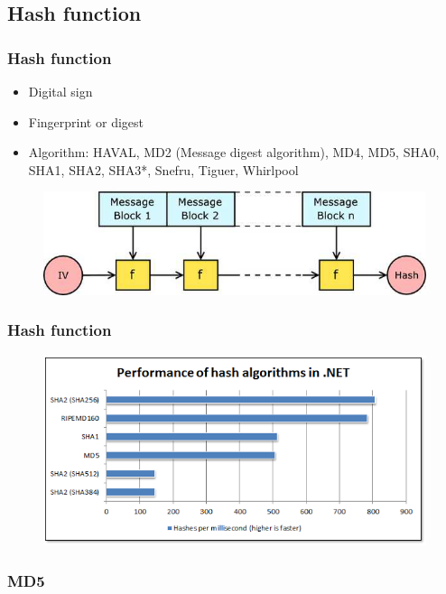 \documentclass{beamer}
\begin{document}
\subsection{Hash function}
\begin{frame}
\frametitle{Hash function}
\begin{itemize}
\item Digital sign
\item Fingerprint or digest
\item Algorithm: HAVAL, MD2 (Message digest algorithm), MD4, MD5, SHA0, SHA1, SHA2, SHA3*, Snefru, Tiguer, Whirlpool 
\end{itemize}
\begin{figure}
\includegraphics[width=0.6\linewidth]{hash.png}
\end{figure}
\end{frame}

\begin{frame}
\frametitle{Hash function}
\begin{figure}
\includegraphics[width=0.9\linewidth]{comp.png}
\end{figure}
\end{frame}

\subsubsection{MD5}
\end{document}

